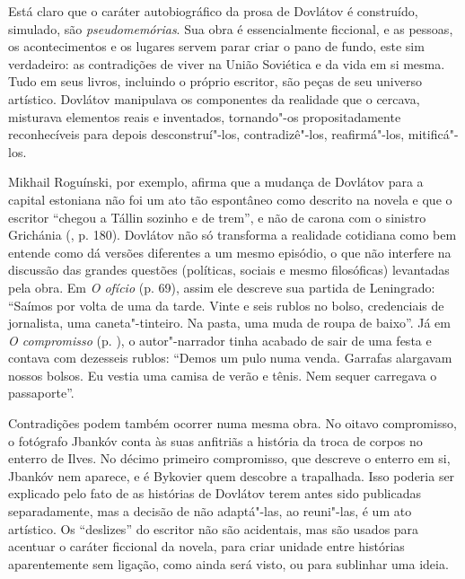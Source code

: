 Está claro que o caráter autobiográfico da prosa de Dovlátov é
construído, simulado, são \emph{pseudomemórias}. Sua obra é
essencialmente ficcional, e as pessoas, os acontecimentos e os lugares
servem parar criar o pano de fundo, este sim verdadeiro: as contradições
de viver na União Soviética e da vida em si mesma. Tudo em seus livros,
incluindo o próprio escritor, são peças de seu universo artístico.
Dovlátov manipulava os componentes da realidade que o cercava, misturava
elementos reais e inventados, tornando"-os propositadamente reconhecíveis
para depois desconstruí"-los, contradizê"-los, reafirmá"-los, mitificá"-los.

Mikhail Roguínski, por exemplo, afirma que a mudança de Dovlátov para a
capital estoniana não foi um ato tão espontâneo como descrito na novela
e que o escritor ``chegou a Tállin sozinho e de trem'', e não de carona
com o sinistro Grichánia (, p. 180). Dovlátov não só transforma
a realidade cotidiana como bem entende como dá versões diferentes a um
mesmo episódio, o que não interfere na discussão das grandes questões
(políticas, sociais e mesmo filosóficas) levantadas pela obra. Em
\emph{O ofício} (p. 69), assim ele descreve sua partida de Leningrado:
``Saímos por volta de uma da tarde. Vinte e seis rublos no bolso,
credenciais de jornalista, uma caneta"-tinteiro. Na pasta, uma muda de
roupa de baixo''. Já em \emph{O compromisso} (p. \pageref{ref3}), o
autor"-narrador tinha acabado de sair de uma festa e contava com
dezesseis rublos: ``Demos um pulo numa venda. Garrafas alargavam nossos
bolsos. Eu vestia uma camisa de verão e tênis. Nem sequer carregava o
passaporte''.

Contradições podem também ocorrer numa mesma obra. No oitavo
compromisso, o fotógrafo Jbankóv conta às suas anfitriãs a história da
troca de corpos no enterro de Ilves. No décimo primeiro compromisso, que
descreve o enterro em si, Jbankóv nem aparece, e é Bykovier quem
descobre a trapalhada. Isso poderia ser explicado pelo fato de as
histórias de Dovlátov terem antes sido publicadas separadamente, mas a
decisão de não adaptá"-las, ao reuni"-las, é um ato artístico. Os
``deslizes'' do escritor não são acidentais, mas são usados para
acentuar o caráter ficcional da novela, para criar unidade entre
histórias aparentemente sem ligação, como ainda será visto, ou para
sublinhar uma ideia.

